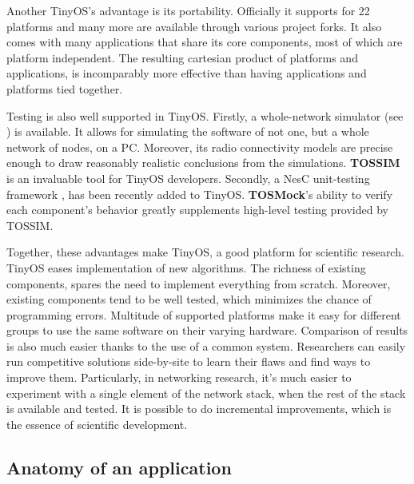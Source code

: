 Another TinyOS's advantage is its portability. Officially it supports for 22 platforms and many more are available through various project forks. It also comes with many applications that share its core components, most of which are platform independent. The resulting cartesian product of platforms and applications, is incomparably more effective than having applications and platforms tied together.

Testing is also well supported in TinyOS. Firstly, a whole-network simulator (see \cite{TOSSIM}) is available. It allows for simulating the software of not one, but a whole network of nodes, on a PC. Moreover, its radio connectivity models are precise enough to draw reasonably realistic conclusions from the simulations. {\bf TOSSIM} is an invaluable tool for TinyOS developers. Secondly, a NesC unit-testing framework \cite{TOSMock}, has been recently added to TinyOS. {\bf TOSMock}'s ability to verify each component's behavior greatly supplements high-level testing provided by TOSSIM.

Together, these advantages make TinyOS, a good platform for scientific research. TinyOS eases implementation of new algorithms. The richness of existing components, spares the need to implement everything from scratch.  Moreover, existing components tend to be well tested, which minimizes the chance of programming errors.  Multitude of supported platforms make it easy for different groups to use the same software on their varying hardware.  Comparison of results is also much easier thanks to the use of a common system.  Researchers can easily run competitive solutions side-by-site to learn their flaws and find ways to improve them.  Particularly, in networking research, it's much easier to experiment with a single element of the network stack, when the rest of the stack is available and tested. It is possible to do incremental improvements, which is the essence of scientific development.

\subsection{Anatomy of an application}

